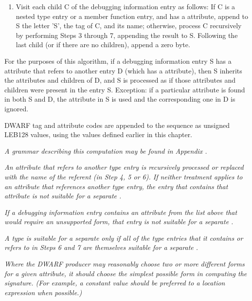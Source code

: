\begin{enumerate}[1. ]
\item Visit each child C of the debugging information
entry as follows: If C is a nested type entry or a member
function entry, and has 
a \DWATname{} attribute, append to
S the letter 'S', the tag of C, and its name; otherwise,
process C recursively by performing Steps 3 through 7,
appending the result to S. Following the last child (or if
there are no children), append a zero byte.
\end{enumerate}



For the purposes of this algorithm, if a debugging information
entry S has a 
\DWATspecification{} 
attribute that refers to
another entry D (which has a 
\DWATdeclaration{} 
attribute),
then S inherits the attributes and children of D, and S is
processed as if those attributes and children were present in
the entry S. Exception: if a particular attribute is found in
both S and D, the attribute in S is used and the corresponding
one in D is ignored.

DWARF tag and attribute codes are appended to the sequence
as unsigned LEB128 values, 
using the values defined earlier in this chapter.

\textit{A grammar describing this computation may be found in
Appendix .
}

\textit{An attribute that refers to another type entry is
recursively processed or replaced with the name of the
referent (in Step 4, 5 or 6). If neither treatment applies to
an attribute that references another type entry, the entry
that contains that attribute is not suitable for a
separate .}

\textit{If a debugging information entry contains an attribute from
the list above that would require an unsupported form, that
entry is not suitable for a separate 
.}

\textit{A type is suitable for a separate 
 only
if all of the type entries that it contains or refers to in
Steps 6 and 7 are themselves suitable for a separate
.}

\textit{Where the DWARF producer may reasonably choose two or 
more different forms for a given attribute, it should choose
the simplest possible form in computing the signature. (For
example, a constant value should be preferred to a location
expression when possible.)}

